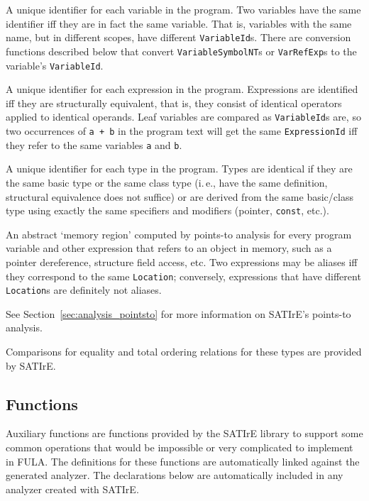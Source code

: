 \documentclass[a4paper,12pt]{report}
\begin{document}
\begin{description}
    A unique identifier for each variable in the program. Two variables have
    the same identifier iff they are in fact the same variable. That is,
    variables with the same name, but in different scopes, have different
    \texttt{VariableId}s. There are conversion functions described below
    that convert \texttt{VariableSymbolNT}s or \texttt{VarRefExp}s to the
    variable's \texttt{VariableId}.

    A unique identifier for each expression in the program. Expressions are
    identified iff they are structurally equivalent, that is, they consist
    of identical operators applied to identical operands. Leaf variables are
    compared as \texttt{VariableId}s are, so two occurrences of \verb|a + b|
    in the program text will get the same \texttt{ExpressionId} iff they
    refer to the same variables \texttt{a} and \texttt{b}.

    A unique identifier for each type in the program. Types are identical if
    they are the same basic type or the same class type (i.\,e., have the
    same definition, structural equivalence does not suffice) or are derived
    from the same basic/class type using exactly the same specifiers and
    modifiers (pointer, \texttt{const}, etc.).

    An abstract `memory region' computed by points-to analysis for every
    program variable and other expression that refers to an object in
    memory, such as a pointer dereference, structure field access, etc. Two
    expressions may be aliases iff they correspond to the same
    \texttt{Location}; conversely, expressions that have different
    \texttt{Location}s are definitely not aliases.

    See Section~\ref{sec:analysis_pointsto} for more information on SATIrE's
    points-to analysis.
\end{description}

Comparisons for equality and total ordering relations for these types are
provided by SATIrE.

\subsection{Functions}
\label{sec:support_functions}

Auxiliary functions are functions provided by the SATIrE library to support
some common operations that would be impossible or very complicated to
implement in FULA. The definitions for these functions are automatically
linked against the generated analyzer. The declarations below are
automatically included in any analyzer created with SATIrE.
\end{document}
